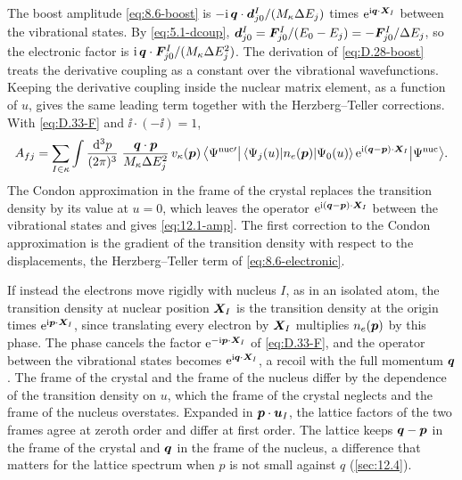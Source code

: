 The boost amplitude \cref{eq:8.6-boost} is $-\mathrm{i}\,\bm{q}\cdot\bm{d}^I_{j0}/(M_\kappa\Delta E_j)$ times $\mathrm{e}^{\mathrm{i}\bm{q}\cdot\bm{X}_I}$ between the vibrational states. By \cref{eq:5.1-dcoup}, $\bm{d}^I_{j0} = \bm{F}^I_{j0}/(E_0 - E_j) = -\bm{F}^I_{j0}/\Delta E_j$, so the electronic factor is $\mathrm{i}\,\bm{q}\cdot\bm{F}^I_{j0}/(M_\kappa\Delta E_j^2)$. The derivation of \cref{eq:D.28-boost} treats the derivative coupling as a constant over the vibrational wavefunctions. Keeping the derivative coupling inside the nuclear matrix element, as a function of $u$, gives the same leading term together with the Herzberg--Teller corrections. With \cref{eq:D.33-F} and $\ii\cdot(-\ii) = 1$,
\begin{equation*}
  A_{fj} = \sum_{I\in\kappa}\int\frac{\mathrm{d}^3p}{(2\pi)^3}\;\frac{\bm{q}\cdot\bm{p}}{M_\kappa\Delta E_j^2}\,v_\kappa(\bm{p})\,
  \bigl\langle\Psi^{\mathrm{nuc}\prime}\big|\,\langle\Psi_j(u)|n_e(\bm{p})|\Psi_0(u)\rangle\,\mathrm{e}^{\mathrm{i}(\bm{q} - \bm{p})\cdot\bm{X}_I}\big|\Psi^{\mathrm{nuc}}\bigr\rangle .
\end{equation*}
The Condon approximation in the frame of the crystal replaces the transition density by its value at $u = 0$, which leaves the operator $\mathrm{e}^{\mathrm{i}(\bm{q}-\bm{p})\cdot\bm{X}_I}$ between the vibrational states and gives \cref{eq:12.1-amp}. The first correction to the Condon approximation is the gradient of the transition density with respect to the displacements, the Herzberg--Teller term of \cref{eq:8.6-electronic}.

If instead the electrons move rigidly with nucleus $I$, as in an isolated atom, the transition density at nuclear position $\bm{X}_I$ is the transition density at the origin times $\mathrm{e}^{\mathrm{i}\bm{p}\cdot\bm{X}_I}$, since translating every electron by $\bm{X}_I$ multiplies $n_e(\bm{p})$ by this phase. The phase cancels the factor $\mathrm{e}^{-\mathrm{i}\bm{p}\cdot\bm{X}_I}$ of \cref{eq:D.33-F}, and the operator between the vibrational states becomes $\mathrm{e}^{\mathrm{i}\bm{q}\cdot\bm{X}_I}$, a recoil with the full momentum $\bm{q}$. The frame of the crystal and the frame of the nucleus differ by the dependence of the transition density on $u$, which the frame of the crystal neglects and the frame of the nucleus overstates. Expanded in $\bm{p}\cdot\bm{u}_I$, the lattice factors of the two frames agree at zeroth order and differ at first order. The lattice keeps $\bm{q} - \bm{p}$ in the frame of the crystal and $\bm{q}$ in the frame of the nucleus, a difference that matters for the lattice spectrum when $p$ is not small against $q$ (\cref{sec:12.4}).

